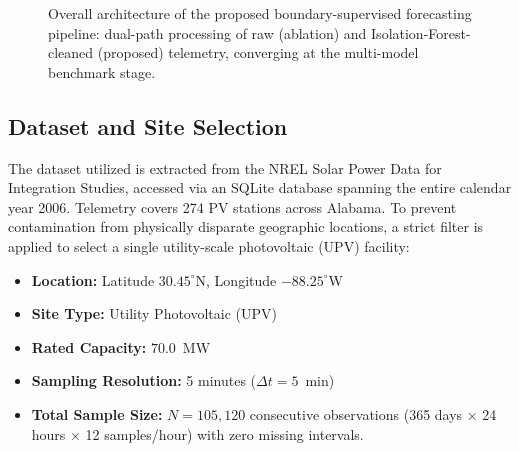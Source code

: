 \documentclass[conference]{IEEEtran}
\begin{document}
\begin{figure}[t]
\caption{Overall architecture of the proposed boundary-supervised forecasting pipeline: dual-path processing of raw (ablation) and Isolation-Forest-cleaned (proposed) telemetry, converging at the multi-model benchmark stage.}
\label{fig:architecture}
\end{figure}

\subsection{Dataset and Site Selection}
The dataset utilized is extracted from the NREL Solar Power Data for Integration Studies, accessed via an SQLite database spanning the entire calendar year 2006. Telemetry covers 274 PV stations across Alabama. To prevent contamination from physically disparate geographic locations, a strict filter is applied to select a single utility-scale photovoltaic (UPV) facility:
\begin{itemize}
    \item \textbf{Location:} Latitude $30.45^\circ$N, Longitude $-88.25^\circ$W
    \item \textbf{Site Type:} Utility Photovoltaic (UPV)
    \item \textbf{Rated Capacity:} $70.0$~MW
    \item \textbf{Sampling Resolution:} 5 minutes ($\Delta t = 5$~min)
    \item \textbf{Total Sample Size:} $N = 105{,}120$ consecutive observations (365 days $\times$ 24 hours $\times$ 12 samples/hour) with zero missing intervals.
\end{itemize}
\end{document}
